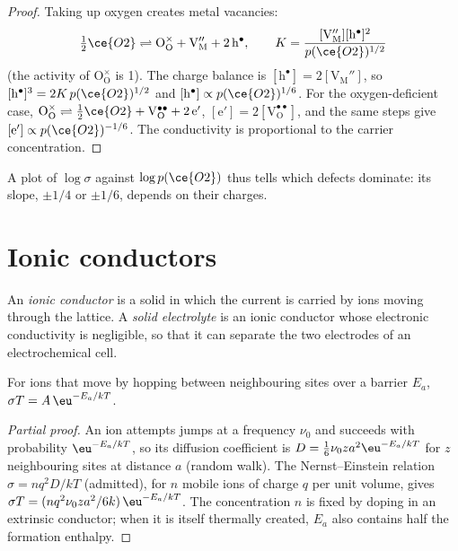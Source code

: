 \begin{proof}
Taking up oxygen creates metal vacancies:
\[
  \tfrac12\ce{O2} \rightleftharpoons \mathrm{O_O^{\times} + V_M'' + 2\,h^{\bullet}}, \qquad K = \frac{[\mathrm{V_M''}][\mathrm h^\bullet]^2}{p(\ce{O2})^{1/2}}
\]
(the activity of $\mathrm{O_O^{\times}}$ is 1). The
charge balance is $[\mathrm h^\bullet] = 2[\mathrm{V_M''}]$, so $[\mathrm h^\bullet]^3 = 2K\,p(\ce{O2})^{1/2}$ and $[\mathrm h^\bullet] \propto p(\ce{O2})^{1/6}$. For the
oxygen-deficient case, $\mathrm{O_O^{\times}} \rightleftharpoons \tfrac12\ce{O2} + \mathrm{V_O^{\bullet\bullet} + 2\,e'}$, $[\mathrm e'] = 2[\mathrm{V_O^{\bullet\bullet}}]$, and the same steps give $[\mathrm e'] \propto p(\ce{O2})^{-1/6}$.
The conductivity is proportional to the carrier concentration.
\end{proof}

A plot of $\log\sigma$ against $\log p(\ce{O2})$ thus tells which defects dominate: its slope,
$\pm 1/4$ or $\pm 1/6$, depends on their charges.

\section{Ionic conductors}

\begin{definition}\label{def:b3:solid-state:ionic-conductor}
An \emph{ionic conductor} is a solid in which the current
is carried by ions moving through the lattice. A \emph{solid
electrolyte} is an ionic conductor whose electronic
conductivity is negligible, so that it can separate the two electrodes of an
electrochemical cell.
\end{definition}

\begin{proposition}\label{prop:b3:solid-state:ionic-arrhenius}
For ions that move by hopping between neighbouring sites over a barrier $E_a$,
$\sigma T = A\,\eu^{-E_a/kT}$.
\end{proposition}

\begin{proof}[Partial proof]
An ion attempts jumps at a frequency $\nu_0$ and succeeds with probability $\eu^{-E_a/kT}$,
so its diffusion coefficient is $D = \tfrac16\nu_0 z a^2\eu^{-E_a/kT}$ for $z$ neighbouring sites at
distance $a$ (random walk). The Nernst--Einstein relation $\sigma = nq^2D/kT$ (admitted), for $n$
mobile ions of charge $q$ per unit volume, gives $\sigma T = (nq^2\nu_0za^2/6k)\,\eu^{-E_a/kT}$. The
concentration $n$ is fixed by doping in an extrinsic conductor; when it is
itself thermally created, $E_a$ also contains half the formation enthalpy.
\end{proof}

